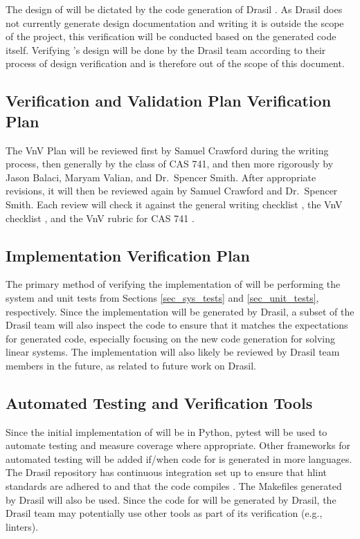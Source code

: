 \documentclass[12pt, titlepage]{article}
\begin{document}
The design of \progname{} will be dictated by the code generation of Drasil
\cite{carette_drasil_2021}. As Drasil does not currently generate design
documentation \cite{carette_drasil_2021} and writing it is outside the scope of
the \progname{} project, this verification will be conducted
based on the generated code itself. Verifying \progname's
design will be done by the Drasil team according to their process of design
verification and is therefore out of the scope of this document.

\subsection{Verification and Validation Plan Verification Plan}
\label{sec_vnv_verif_plan}

The VnV Plan will be reviewed first by Samuel Crawford during the writing
process, then generally by the class of CAS 741, and then more rigorously by
Jason Balaci, Maryam Valian, and Dr.~Spencer Smith. After appropriate
revisions, it will then be reviewed again by Samuel Crawford and Dr.~Spencer
Smith. Each review will check it against the general writing checklist
\cite{writing_checklist}, the VnV checklist \cite{vnv_checklist},
and the VnV rubric for CAS 741 .

\subsection{Implementation Verification Plan}

The primary method of verifying the implementation of \progname{} will be
performing the system and unit tests from Sections \ref{sec_sys_tests} and
\ref{sec_unit_tests}, respectively. Since the implementation will be
generated by Drasil, a subset of the Drasil team will also inspect the code to
ensure that it matches the expectations for generated code, especially focusing
on the new code generation for solving linear systems.
The implementation will also likely be reviewed by Drasil team members in the
future, as related to future work on Drasil.

\subsection{Automated Testing and Verification Tools}

Since the initial implementation of \progname{} will be in Python, pytest will
be used to automate testing and measure coverage where appropriate. Other
frameworks for automated testing will be added if/when code for \progname{} is
generated in more languages. The Drasil repository has continuous integration
set up to ensure that hlint standards are adhered to and that the code
compiles . The Makefiles generated by Drasil
\cite{carette_drasil_2021} will also be used.
Since the code for \progname{} will be generated
by Drasil, the Drasil team may potentially use other tools as part of its
verification (e.g., linters).
\end{document}
